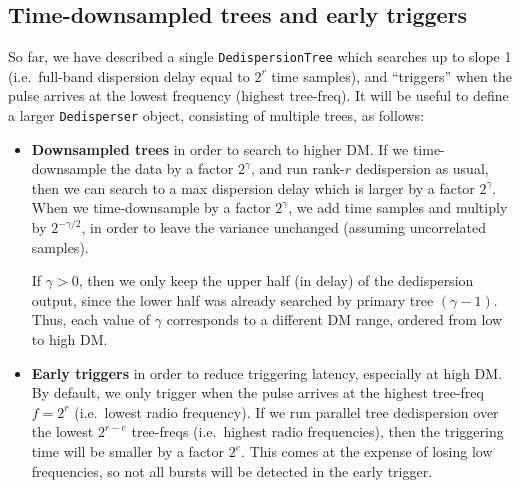 \documentclass{article}
\numberwithin{equation}{section}   %
\begin{document}
\subsection{Time-downsampled trees and early triggers}
\label{sec:downsampled_early}

So far, we have described a single {\tt DedispersionTree} which searches up to slope 1 (i.e.~full-band dispersion delay equal to $2^r$ time samples), and ``triggers'' when the pulse arrives at the lowest frequency (highest tree-freq).
It will be useful to define a larger {\tt Dedisperser} object, consisting of multiple trees, as follows:

\begin{itemize}

\item {\bf Downsampled trees} in order to search to higher DM. 
If we time-downsample the data by a factor $2^\gamma$, and run rank-$r$ dedispersion as usual, then we can search to a max dispersion delay which is larger by a factor $2^\gamma$.
When we time-downsample by a factor $2^\gamma$, we add time samples and multiply by $2^{-\gamma/2}$, in order to leave the variance unchanged (assuming uncorrelated samples).

If $\gamma > 0$, then we only keep the upper half (in delay) of the dedispersion output, since the lower half was already searched by primary tree $(\gamma-1)$.
Thus, each value of $\gamma$ corresponds to a different DM range, ordered from low to high DM.

\item {\bf Early triggers} in order to reduce triggering latency, especially at high DM. 
By default, we only trigger when the pulse arrives at the highest tree-freq $f=2^r$ (i.e.\ lowest radio frequency).
If we run parallel tree dedispersion over the lowest $2^{r-e}$ tree-freqs (i.e.\ highest radio frequencies),
then the triggering time will be smaller by a factor $2^e$.
This comes at the expense of losing low frequencies, so not all bursts will be detected in the early trigger.

\end{itemize}
\end{document}

